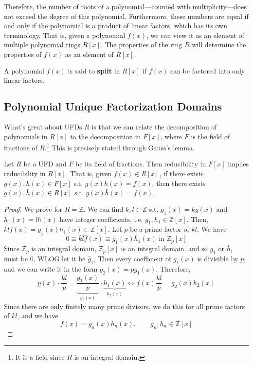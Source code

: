   Therefore, the number of roots of a polynomial---counted with multiplicity---does not exceed the degree of this polynomial. Furthermore, these numbers are equal if and only if the polynomial is a product of linear factors, which has its own terminology. That is, given a polynomial $f(x)$, we can view it as an element of multiple \hyperref[def:polynomial-ring]{polynomial rings} $R[x]$. The properties of the ring $R$ will determine the properties of $f(x)$ as an element of $R[x]$. 

  \begin{theorem}
    \label{thm:splitting-ring-field}
    A polynomial $f(x)$ is said to \textbf{split} in $R[x]$ if $f(x)$ can be factored into only linear factors. 
  \end{theorem}

\subsection{Polynomial Unique Factorization Domains}

  What's great about UFDs $R$ is that we can relate the decomposition of polynomials in $R[x]$ to the decomposition in $F[x]$, where $F$ is the field of fractions of $R$.\footnote{It is a field since $R$ is an integral domain.} This is precisely stated through Gauss's lemma. 

  \begin{lemma}
    \label{thm:gausss-lemma}
    Let $R$ be a UFD and $F$ be its field of fractions. Then reducibility in $F[x]$ implies reducibility in $R[x]$. That is, given $f(x) \in R[x]$, if there exists $g(x), h(x) \in F[x]$ s.t. $g(x) h(x) = f(x)$, then there exists $\bar{g}(x), \bar{h}(x) \in R[x]$ s.t. $\bar{g}(x) \bar{h}(x) = f(x)$. 
  \end{lemma}
  \begin{proof}
    We prove for $R = \mathbb{Z}$. We can find $k, l \in \mathbb{Z}$ s.t. $g_1 (x) = k g(x)$ and $h_1 (x) = l h(x)$ have integer coefficients, i.e. $g_1, h_1 \in \mathbb{Z}[x]$. Then, $k l f(x) = g_1 (x) h_1 (x) \in \mathbb{Z}[x]$. Let $p$ be a prime factor of $kl$. We have 
    \begin{equation}
      0 \equiv \bar{k} \bar{l} \bar{f} (x) \equiv \bar{g}_1 (x) \bar{h}_1 (x) \text{ in } \mathbb{Z}_p [x]
    \end{equation}
    Since $\mathbb{Z}_p$ is an integral domain, $\mathbb{Z}_p [x]$ is an integral domain, and so $\bar{g}_1$ or $\bar{h}_1$ must be $0$. WLOG let it be $\bar{g}_1$. Then every coefficient of $g_1 (x)$ is divisible by $p$, and we can write it in the form $g_2(x) = p g_1 (x)$. Therefore, 
    \begin{equation}
      p(x) \cdot \frac{kl}{p} = \underbrace{\frac{g_1 (x)}{p}}_{g_2 (x)} \cdot \underbrace{h_1 (x)}_{h_2 (x)} \iff f(x) \frac{kl}{p} = g_2 (x) h_2 (x)
    \end{equation}
    Since there are only finitely many prime divisors, we do this for all prime factors of $kl$, and we have 
    \begin{equation}
      f(x) = g_n (x) h_n (x), \qquad g_n, h_n \in \mathbb{Z}[x]
    \end{equation}
  \end{proof}

